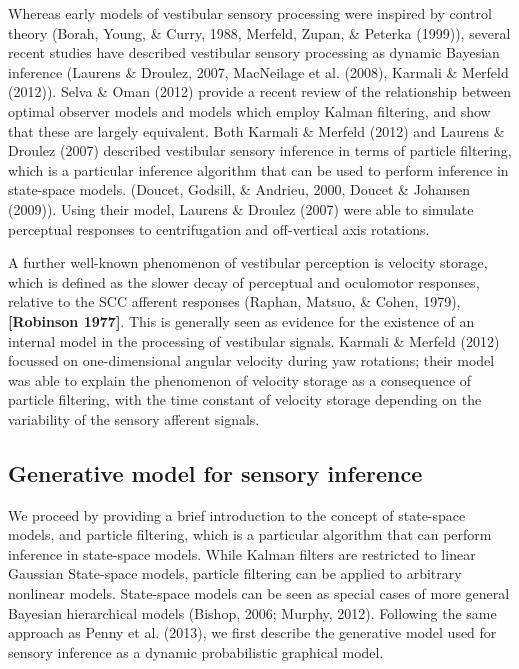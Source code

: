 \documentclass[english,floatsintext,man]{apa6}
\theoremstyle{definition}
\theoremstyle{definition}
\theoremstyle{remark}
\begin{document}
Whereas early models of vestibular sensory processing were inspired by
control theory (Borah, Young, \& Curry, 1988, Merfeld, Zupan, \& Peterka
(1999)), several recent studies have described vestibular sensory
processing as dynamic Bayesian inference (Laurens \& Droulez, 2007,
MacNeilage et al. (2008), Karmali \& Merfeld (2012)). Selva \& Oman
(2012) provide a recent review of the relationship between optimal
observer models and models which employ Kalman filtering, and show that
these are largely equivalent. Both Karmali \& Merfeld (2012) and Laurens
\& Droulez (2007) described vestibular sensory inference in terms of
particle filtering, which is a particular inference algorithm that can
be used to perform inference in state-space models. (Doucet, Godsill, \&
Andrieu, 2000, Doucet \& Johansen (2009)). Using their model, Laurens \&
Droulez (2007) were able to simulate perceptual responses to
centrifugation and off-vertical axis rotations.

A further well-known phenomenon of vestibular perception is velocity
storage, which is defined as the slower decay of perceptual and
oculomotor responses, relative to the SCC afferent responses (Raphan,
Matsuo, \& Cohen, 1979), \textbf{{[}Robinson 1977{]}}. This is generally
seen as evidence for the existence of an internal model in the
processing of vestibular signals. Karmali \& Merfeld (2012) focussed on
one-dimensional angular velocity during yaw rotations; their model was
able to explain the phenomenon of velocity storage as a consequence of
particle filtering, with the time constant of velocity storage depending
on the variability of the sensory afferent signals.

\subsection{Generative model for sensory
inference}\label{generative-model-for-sensory-inference}

We proceed by providing a brief introduction to the concept of
state-space models, and particle filtering, which is a particular
algorithm that can perform inference in state-space models. While Kalman
filters are restricted to linear Gaussian State-space models, particle
filtering can be applied to arbitrary nonlinear models. State-space
models can be seen as special cases of more general Bayesian
hierarchical models (Bishop, 2006; Murphy, 2012). Following the same
approach as Penny et al. (2013), we first describe the generative model
used for sensory inference as a dynamic probabilistic graphical model.
\end{document}
